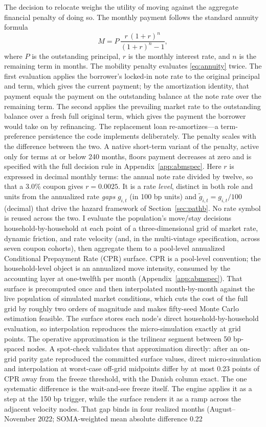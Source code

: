 \documentclass[12pt]{article}
\begin{document}
The decision to relocate weighs the utility of moving against the aggregate financial penalty of doing so. The monthly payment follows the standard annuity formula
\begin{equation}\label{eq:annuity}
M = P\,\frac{r\,(1+r)^{n}}{(1+r)^{n}-1},
\end{equation}
where $P$ is the outstanding principal, $r$ is the monthly interest rate, and $n$ is the remaining term in months. The mobility penalty evaluates \eqref{eq:annuity} twice. The first evaluation applies the borrower's locked-in note rate to the original principal and term, which gives the current payment; by the amortization identity, that payment equals the payment on the outstanding balance at the note rate over the remaining term. The second applies the prevailing market rate to the outstanding balance over a fresh full original term, which gives the payment the borrower would take on by refinancing. The replacement loan re-amortizes---a term-preference persistence the code implements deliberately. The penalty scales with the difference between the two. A native short-term variant of the penalty, active only for terms at or below 240 months, floors payment decreases at zero and is specified with the full decision rule in Appendix~\ref{app:abmspec}. Here $r$ is expressed in decimal monthly terms: the annual note rate divided by twelve, so that a 3.0\% coupon gives $r = 0.0025$. It is a rate \emph{level}, distinct in both role and units from the annualized rate \emph{gaps} $g_{i,t}$ (in 100 bp units) and $\tilde g_{i,t} = g_{i,t}/100$ (decimal) that drive the hazard framework of Section~\ref{sec:pathb}. No rate symbol is reused across the two. I evaluate the population's move/stay decisions household-by-household at each point of a three-dimensional grid of market rate, dynamic friction, and rate velocity (and, in the multi-vintage specification, across seven coupon cohorts), then aggregate them to a pool-level annualized Conditional Prepayment Rate (CPR) surface. CPR is a pool-level convention; the household-level object is an annualized move intensity, consumed by the accounting layer at one-twelfth per month (Appendix~\ref{app:abmspec}). That surface is precomputed once and then interpolated month-by-month against the live population of simulated market conditions, which cuts the cost of the full grid by roughly two orders of magnitude and makes fifty-seed Monte Carlo estimation feasible. The surface stores each node's direct household-by-household evaluation, so interpolation reproduces the micro-simulation exactly at grid points. The operative approximation is the trilinear segment between 50 bp-spaced nodes. A spot-check validates that approximation directly: after an on-grid parity gate reproduced the committed surface values, direct micro-simulation and interpolation at worst-case off-grid midpoints differ by at most 0.23 points of CPR away from the freeze threshold, with the Danish column exact. The one systematic difference is the wait-and-see freeze itself. The engine applies it as a step at the 150 bp trigger, while the surface renders it as a ramp across the adjacent velocity nodes. That gap binds in four realized months (August--November 2022; SOMA-weighted mean absolute difference 0.22 
\end{document}
